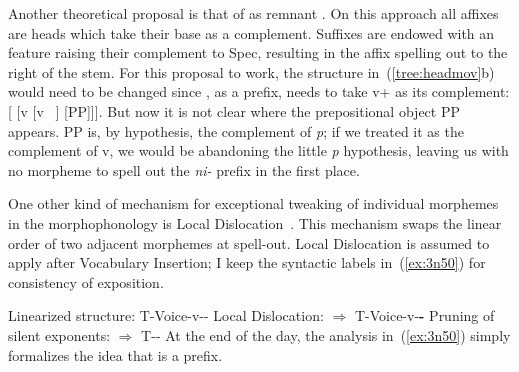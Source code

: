 \begin{exe}
\begin{xlist}
\begin{xlist}
\begin{exe}
\begin{xlist}
\begin{xlist}
\begin{exe}
\begin{xlist}
\begin{xlist}
\begin{exe}
\begin{exe}
\begin{xlist}
\begin{exe}
\begin{exe}
\begin{xlist}
\begin{exe}
\begin{exe}
\begin{exe}
\begin{exe}
\begin{exe}
\begin{xlist}
\begin{exe}
\begin{xlist}
\begin{exe}
\begin{exe}
\begin{xlist}
\begin{exe}
\begin{xlist}
\begin{exe}
\begin{exe}
\begin{exe}
\begin{xlist}
\begin{exe}
\begin{exe}
\begin{exe}
\begin{xlist}
\begin{exe}
\begin{xlist}
\begin{exe}
\begin{xlist}
\begin{exe}
\begin{xlist}
\begin{exe}
\begin{exe}
\begin{exe}
\begin{exe}
\begin{xlist}
\begin{exe}
\begin{xlist}
\begin{exe}
\begin{xlist}
\begin{exe}
\begin{xlist}
\begin{exe}
\begin{xlist}
\begin{exe}
\begin{xlist}
\begin{exe}
\begin{exe}
\begin{exe}
\begin{exe}
\begin{xlist}
\begin{exe}
\begin{xlist}
Another theoretical proposal is that of  as remnant  \citep{koopmanszabolcsi00,koopman05,koopman15u20}. On this approach all affixes are heads which take their base as a complement. Suffixes are endowed with an  feature raising their complement to Spec, resulting in the affix spelling out to the right of the stem. For this proposal to work, the structure in~(\ref{tree:headmov}b) would need to be changed since \pz, as a prefix, needs to take v+ as its complement: [{\pz} [v [v ~\!] [PP]]]. But now it is not clear where the prepositional object PP appears. PP is, by hypothesis, the complement of \emph{p}; if we treated it as the complement of v, we would be abandoning the little \emph{p} hypothesis, leaving us with no morpheme to spell out the \emph{ni-} prefix in the first place.

One other kind of mechanism for exceptional tweaking of individual morphemes in the morphophonology is Local Dislocation~\citep{embicknoyer01}. This mechanism swaps the linear order of two adjacent morphemes at spell-out. Local Dislocation is assumed to apply after Vocabulary Insertion; I keep the syntactic labels in~(\ref{ex:3n50}) for consistency of exposition.
 \begin{exe}
 \ex  \label{ex:3n50}
 \begin{xlist} 
 	\ex  Linearized structure: 
		T-Voice-v--\pz
 	\ex  Local Dislocation: 
		$\Rightarrow$ T-Voice-v-\textbf{\pz-}
 	\ex  Pruning of silent exponents: 
		$\Rightarrow$ T-\pz-
 \z
\z 
At the end of the day, the analysis in~(\ref{ex:3n50}) simply formalizes the idea that {\pz} is a prefix.


\end{xlist}
\end{exe}
\end{xlist}
\end{exe}
\end{xlist}
\end{exe}
\end{exe}
\end{exe}
\end{exe}
\end{xlist}
\end{exe}
\end{xlist}
\end{exe}
\end{xlist}
\end{exe}
\end{xlist}
\end{exe}
\end{xlist}
\end{exe}
\end{xlist}
\end{exe}
\end{exe}
\end{exe}
\end{exe}
\end{xlist}
\end{exe}
\end{xlist}
\end{exe}
\end{xlist}
\end{exe}
\end{xlist}
\end{exe}
\end{exe}
\end{exe}
\end{xlist}
\end{exe}
\end{exe}
\end{exe}
\end{xlist}
\end{exe}
\end{xlist}
\end{exe}
\end{exe}
\end{xlist}
\end{exe}
\end{xlist}
\end{exe}
\end{exe}
\end{exe}
\end{exe}
\end{exe}
\end{xlist}
\end{exe}
\end{exe}
\end{xlist}
\end{exe}
\end{exe}
\end{xlist}
\end{xlist}
\end{exe}
\end{xlist}
\end{xlist}
\end{exe}
\end{xlist}
\end{xlist}
\end{exe}
